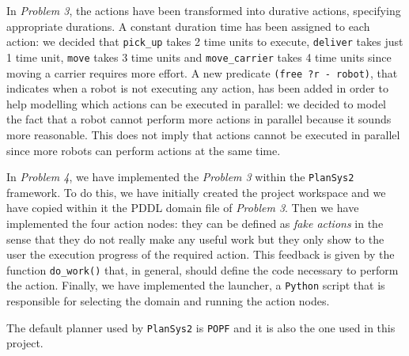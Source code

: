 In \textit{Problem 3}, the actions have been transformed into durative actions, specifying appropriate durations.
A constant duration time has been assigned to each action: we decided that \texttt{pick\_up} takes 2 time 
units to execute, \texttt{deliver} takes just 1 time unit, \texttt{move} takes 3 time units and 
\texttt{move\_carrier} takes 4 time units since moving a carrier requires more effort.
A new predicate \texttt{(free ?r - robot)}, that indicates when a robot is not executing any action,
has been added in order to help modelling which actions can be executed in parallel: we decided to model the 
fact that a robot cannot perform more actions in parallel because it sounds more reasonable.
This does not imply that actions cannot be executed in parallel since more robots can perform
actions at the same time.

In \textit{Problem 4}, we have implemented the \textit{Problem 3} within the \texttt{PlanSys2} framework.
To do this, we have initially created the project workspace and we have copied within it the PDDL domain 
file of \textit{Problem 3}.
Then we have implemented the four action nodes: they can be defined as \textit{fake actions} in the sense 
that they do not really make any useful work but they only show to the user the execution progress of the 
required action. This feedback is given by the function \texttt{do\_work()} that, in
general, should define the code necessary to perform the action.
Finally, we have implemented the launcher, a \texttt{Python} script that is responsible for selecting the
domain and running the action nodes.

The default planner used by \texttt{PlanSys2} is \texttt{POPF} and it is also the one used in this project.

